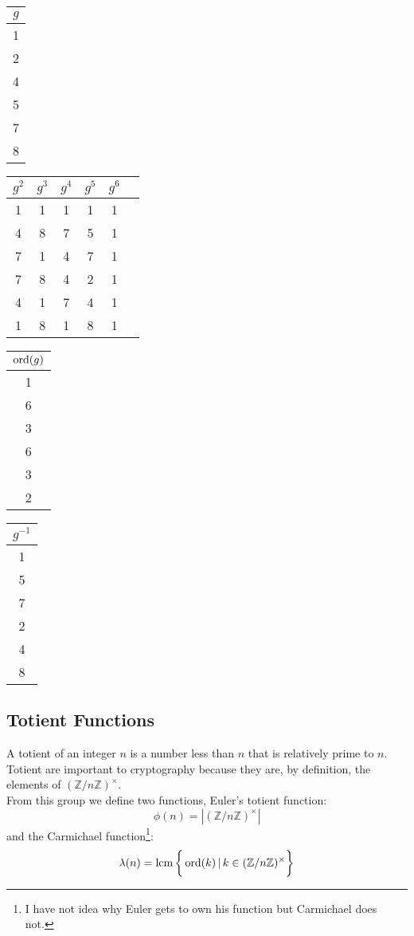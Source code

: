 \begin{center}
\begin{tabular}{|c|}
	\hline
	$g$\\
	\hline
	1\\2\\4\\5\\7\\8\\
	\hline
\end{tabular}
\begin{tabular}{|c|c|c|c|c|c|}
	\hline
	$g^2$&$g^3$&$g^4$&$g^5$&$g^6$\\
	\hline
	1&1&1&1&1\\
	4&8&7&5&1\\
	7&1&4&7&1\\
	7&8&4&2&1\\
	4&1&7&4&1\\
	1&8&1&8&1\\
	\hline
\end{tabular}
\begin{tabular}{|c|}
	\hline
	$\operatorname{ord}(g)$\\
	\hline
	1\\6\\3\\6\\3\\2\\
	\hline
\end{tabular}
\begin{tabular}{|c|}
	\hline
	$g^{-1}$\\
	\hline
	1\\5\\7\\2\\4\\8\\
	\hline
\end{tabular}
\end{center}


\subsection{Totient Functions}
\label{appx:torient}
A totient of an integer $n$ is a number less than $n$ that is relatively prime to $n$.
Totient are important to cryptography because they are, by definition, the elements of $(\mathbb{Z}/n\mathbb{Z})^\times$.
\\

From this group we define two functions,
Euler's totient function:
\[\phi(n) = |(\mathbb{Z}/n\mathbb{Z})^\times|\]
and the Carmichael function\footnote{I have not idea why Euler gets to own his function but Carmichael does not.}:
\[\lambda(n) = \operatorname{lcm}\bigg\{\operatorname{ord}(k)\,|\, k\in(\mathbb{Z}/n\mathbb{Z})^\times\bigg\}\]

